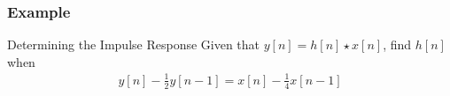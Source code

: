 \documentclass[mathserif,9pt]{beamer}
\begin{document}
\begin{frame}\frametitle{Example}\small
  \begin{exampleblock}{Determining the Impulse Response}
  Given that $y[n] = h[n]\star x[n]$, find $h[n]$ when 
  \begin{align}
    y[n] - \frac{1}{2}y[n - 1] = x[n] - \frac{1}{4} x[n - 1] \nonumber 
  \end{align}
  \end{exampleblock}
  \vspace{1em}
  
  \begin{center}
  \end{center}
\end{frame}
\end{document}
